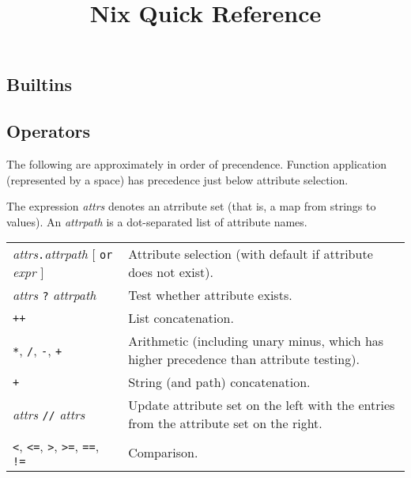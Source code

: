 \documentclass[10pt, a4paper, landscape]{article}
\title{Nix Quick Reference}
\date{\vskip-10ex November 2023}
\newcommand{\cmd}[1]{\texttt{#1}}
\begin{document}
\begin{multicols*}{3}\raggedcolumns%
\maketitle

\section*{Builtins}

\subsection*{Operators}

The following are approximately in order of precendence. Function
application (represented by a space) has precedence just below
attribute selection.

The expression \emph{attrs} denotes an atrribute set (that is, a map
from strings to values). An \emph{attrpath} is a dot-separated list of
attribute names.

\begin{tabularx}{\columnwidth}{@{}l>{\raggedright\arraybackslash}X@{}}

  \parbox[t]{8em}{\emph{attrs}\texttt{.}\emph{attrpath} \\
    $[$ \texttt{or} \emph{expr} $]$}
  & Attribute selection (with default if attribute does not exist). \\

  \emph{attrs} \texttt{?} \emph{attrpath} & Test whether attribute
  exists. \\

  \cmd{++} & List concatenation. \\
  
  \cmd{*}, \cmd{/}, \cmd{-}, \cmd{+} & Arithmetic (including unary
  minus, which has higher precedence than attribute testing). \\
  
  \cmd{+} & String (and path) concatenation. \\

  \emph{attrs} \cmd{//} \emph{attrs} & Update attribute set on the
  left with the entries from the attribute set on the right. \\
  
  \cmd{<}, \cmd{<=}, \cmd{>}, \cmd{>=}, \cmd{==}, \cmd{!=} &
  Comparison. \\


\end{tabularx}
\end{multicols*}
\end{document}
